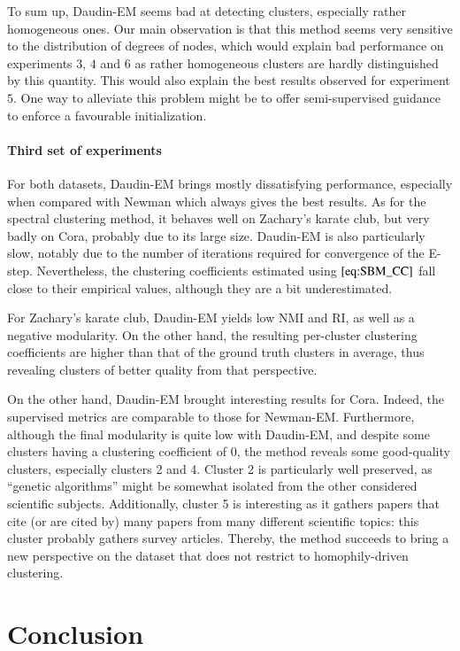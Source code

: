 \documentclass[switch, 12pt]{article}
\begin{document}
\begin{multicols}{2}
    To sum up, Daudin-EM seems bad at detecting clusters, especially rather homogeneous ones. Our main observation is that this method seems very sensitive to the distribution of degrees of nodes, which would explain bad performance on experiments $3$, $4$ and $6$ as rather homogeneous clusters are hardly distinguished by this quantity. This would also explain the best results observed for experiment $5$. One way to alleviate this problem might be to offer semi-supervised guidance to enforce a favourable initialization.

    \paragraph{Third set of experiments} For both datasets, Daudin-EM brings mostly dissatisfying performance, especially when compared with Newman which always gives the best results. As for the spectral clustering method, it behaves well on Zachary's karate club, but very badly on Cora, probably due to its large size. Daudin-EM is also particularly slow, notably due to the number of iterations required for convergence of the E-step. Nevertheless, the clustering coefficients estimated using $\eqref{eq:SBM_CC}$ fall close to their empirical values, although they are a bit underestimated.

    For Zachary's karate club, Daudin-EM yields low NMI and RI, as well as a negative modularity. On the other hand, the resulting per-cluster clustering coefficients are higher than that of the ground truth clusters in average, thus revealing clusters of better quality from that perspective.

    On the other hand, Daudin-EM brought interesting results for Cora. Indeed, the supervised metrics are comparable to those for Newman-EM. Furthermore, although the final modularity is quite low with Daudin-EM, and despite some clusters having a clustering coefficient of 0, the method reveals some good-quality clusters, especially clusters 2 and 4. Cluster 2 is particularly well preserved, as ``genetic algorithms'' might be somewhat isolated from the other considered scientific subjects. Additionally, cluster 5 is interesting as it gathers papers that cite (or are cited by) many papers from many different scientific topics: this cluster probably gathers survey articles. Thereby, the method succeeds to bring a new perspective on the dataset that does not restrict to homophily-driven clustering.


    \section{Conclusion}
    \label{sec:conclusion}


\end{multicols}
\end{document}
